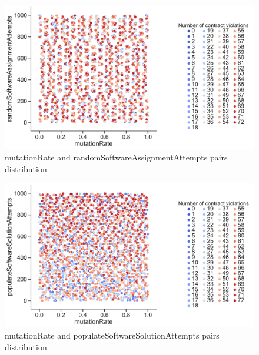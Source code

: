 \begin{figure}
	\centering
	\includegraphics[width=\textwidth]{images/PairsDistr/mutationRate_randomSoftwareAssignmentAttempts.pdf}
	\caption[mutationRate and randomSoftwareAssignmentAttempts pairs distribution]{mutationRate and randomSoftwareAssignmentAttempts pairs distribution}
	\label{fig:mutationRate_randomSoftwareAssignmentAttempts_pair}
\end{figure}
\clearpage
\begin{figure}
	\centering
	\includegraphics[width=\textwidth]{images/PairsDistr/mutationRate_populateSoftwareSolutionAttempts.pdf}
	\caption[mutationRate and populateSoftwareSolutionAttempts pairs distribution]{mutationRate and populateSoftwareSolutionAttempts pairs distribution}
	\label{fig:mutationRate_populateSoftwareSolutionAttempts_pair}
\end{figure}
\clearpage
